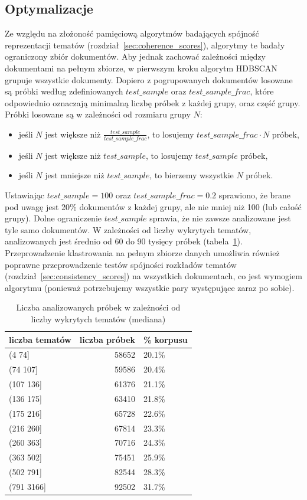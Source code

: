 	\subsection{Optymalizacje}
		Ze względu na złożoność pamięciową algorytmów badających spójność reprezentacji tematów (rozdział~\ref{sec:coherence_scores}),
			algorytmy te badały ograniczony zbiór dokumentów.
		Aby jednak zachować zależności między dokumentami na pełnym zbiorze, w pierwszym kroku algorytm HDBSCAN grupuje wszystkie dokumenty.
		Dopiero z pogrupowanych dokumentów losowane są próbki według zdefiniowanych \(test\_sample\) oraz \(test\_sample\_frac\),
			które odpowiednio oznaczają minimalną liczbę próbek z każdej grupy, oraz część grupy.
		Próbki losowane są w zależności od rozmiaru grupy \(N\):
		\begin{itemize}
			\item jeśli \(N\) jest większe niż \(\frac{test\_sample}{test\_sample\_frac}\), to losujemy \(test\_sample\_frac \cdot N\) próbek,
			\item jeśli \(N\) jest większe niż \(test\_sample\), to losujemy \(test\_sample\) próbek,
			\item jeśli \(N\) jest mniejsze niż \(test\_sample\), to bierzemy wszystkie \(N\) próbek.
		\end{itemize}
		Ustawiając \(test\_sample=100\) oraz \(test\_sample\_frac=0.2\) sprawiono,
			że brane pod uwagę jest 20\% dokumentów z każdej grupy, ale nie mniej niż 100 (lub całość grupy).
		Dolne ograniczenie \(test\_sample\) sprawia, że nie zawsze analizowane jest tyle samo dokumentów.
		W zależności od liczby wykrytych tematów, analizowanych jest średnio od 60 do 90 tysięcy próbek (tabela~\ref{tab:support}).
		Przeprowadzenie klastrowania na pełnym zbiorze danych umożliwia również poprawne przeprowadzenie testów spójności rozkładów tematów (rozdział~\ref{sec:consistency_scores})
			na wszystkich dokumentach, co jest wymogiem algorytmu (ponieważ potrzebujemy wszystkie pary występujące zaraz po sobie).
		
		\begin{table}[htb]
			\caption{Liczba analizowanych próbek w zależności od liczby wykrytych tematów (mediana)}\label{tab:support}
			\centering
			\begin{tabular}{lrl}
				\toprule
				liczba tematów  &  liczba próbek	&	\% korpusu \\
				\midrule
				(4 74]     &  58652 &	20.1\% \\
				(74 107]   &  59586 &	20.4\% \\
				(107 136]  &  61376 &	21.1\% \\
				(136 175]  &  63410 &	21.8\% \\
				(175 216]  &  65728 &	22.6\% \\
				(216 260]  &  67814 &	23.3\% \\
				(260 363]  &  70716 &	24.3\% \\
				(363 502]  &  75451 &	25.9\% \\
				(502 791]  &  82544 &	28.3\% \\
				(791 3166] &  92502 &	31.7\% \\
				\bottomrule
			\end{tabular}
		\end{table}

